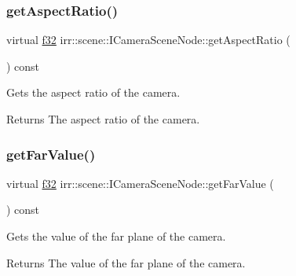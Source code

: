 \subsubsection{\texorpdfstring{get\+Aspect\+Ratio()}{getAspectRatio()}\hspace{0.1cm}{\footnotesize\ttfamily [2/2]}}
{\footnotesize\ttfamily virtual \hyperlink{namespaceirr_a0277be98d67dc26ff93b1a6a1d086b07}{f32} irr\+::scene\+::\+I\+Camera\+Scene\+Node\+::get\+Aspect\+Ratio (\begin{DoxyParamCaption}{ }\end{DoxyParamCaption}) const\hspace{0.3cm}{\ttfamily [pure virtual]}}



Gets the aspect ratio of the camera. 

\begin{DoxyReturn}{Returns}
The aspect ratio of the camera. 
\end{DoxyReturn}
\mbox{\label{classirr_1_1scene_1_1ICameraSceneNode_a7a6603b808522605276359b834d48245}} 
\subsubsection{\texorpdfstring{get\+Far\+Value()}{getFarValue()}\hspace{0.1cm}{\footnotesize\ttfamily [1/2]}}
{\footnotesize\ttfamily virtual \hyperlink{namespaceirr_a0277be98d67dc26ff93b1a6a1d086b07}{f32} irr\+::scene\+::\+I\+Camera\+Scene\+Node\+::get\+Far\+Value (\begin{DoxyParamCaption}{ }\end{DoxyParamCaption}) const\hspace{0.3cm}{\ttfamily [pure virtual]}}



Gets the value of the far plane of the camera. 

\begin{DoxyReturn}{Returns}
The value of the far plane of the camera. 
\end{DoxyReturn}
\mbox{\label{classirr_1_1scene_1_1ICameraSceneNode_a7a6603b808522605276359b834d48245}} 
